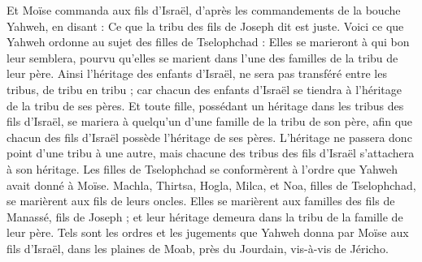 \begin{multicols}{2}
Et Moïse commanda aux fils d'Israël, d'après les commandements de la bouche Yahweh, en disant : Ce que la tribu des fils de Joseph dit est juste.
Voici ce que Yahweh ordonne au sujet des filles de Tselophchad : Elles se marieront à qui bon leur semblera, pourvu qu'elles se marient dans l'une des familles de la tribu de leur père.
Ainsi l'héritage des enfants d'Israël, ne sera pas transféré entre les tribus, de tribu en tribu ; car chacun des enfants d'Israël se tiendra à l'héritage de la tribu de ses pères.
Et toute fille, possédant un héritage dans les tribus des fils d'Israël, se mariera à quelqu'un d'une famille de la tribu de son père, afin que chacun des fils d'Israël possède l'héritage de ses pères.
L'héritage ne passera donc point d'une tribu à une autre, mais chacune des tribus des fils d'Israël s'attachera à son héritage.
Les filles de Tselophchad se conformèrent à l'ordre que Yahweh avait donné à Moïse.
Machla, Thirtsa, Hogla, Milca, et Noa, filles de Tselophchad, se marièrent aux fils de leurs oncles.
Elles se marièrent aux familles des fils de Manassé, fils de Joseph ; et leur héritage demeura dans la tribu de la famille de leur père.
Tels sont les ordres et les jugements que Yahweh donna par Moïse aux fils d'Israël, dans les plaines de Moab, près du Jourdain, vis-à-vis de Jéricho.
\PPE{}
\end{multicols}

